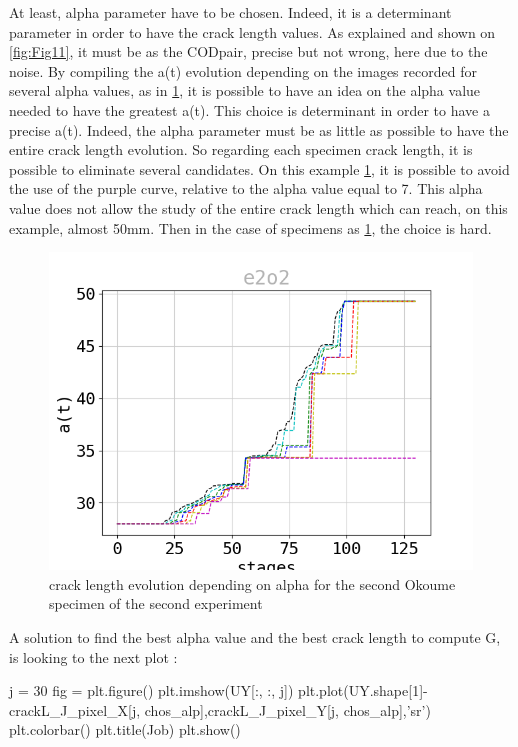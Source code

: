 At least, alpha parameter have to be chosen. Indeed, it is a determinant parameter in order to have the crack length values. As explained and shown on \ref{fig:Fig11}, it must be as the CODpair, precise but not wrong, here due to the noise. By compiling the a(t) evolution depending on the images recorded for several alpha values, as in \ref{fig:a_alpha}, it is possible to have an idea on the alpha value needed to have the greatest a(t). This choice is determinant in order to have a precise  a(t). Indeed, the alpha parameter must be as little as possible to have the entire crack length evolution. So regarding each specimen crack length, it is possible to eliminate several candidates. On this example \ref{fig:a_alpha}, it is possible to avoid the use of the purple curve, relative to the alpha value equal to 7. This alpha value does not allow the study of the entire crack length which can reach, on this example, almost 50\si{\milli\meter}. Then in the case of specimens as \ref{fig:a_alpha}, the choice is hard. 
\begin{figure}[th]
	\centering
	\includegraphics[scale=0.4]{Figures/a_alpha}
	\caption[crack length evolution depending on alpha]{crack length evolution depending on alpha for the second Okoume specimen of the second experiment}
	\label{fig:a_alpha}
\end{figure}
A solution to find the best alpha value and the best crack length to compute G, is looking to the next plot :
\begin{customFrame}
j = 30
fig = plt.figure()
plt.imshow(UY[:, :, j])
plt.plot(UY.shape[1]-crackL_J_pixel_X[j, chos_alp],crackL_J_pixel_Y[j, chos_alp],'sr')
plt.colorbar()
plt.title(Job)
plt.show()
\end{customFrame}
